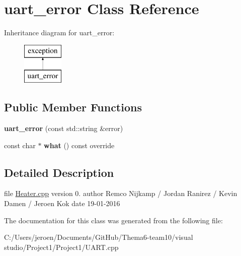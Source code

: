 \hypertarget{classuart__error}{}\section{uart\+\_\+error Class Reference}
\label{classuart__error}
Inheritance diagram for uart\+\_\+error\+:\begin{figure}[H]
\begin{center}
\leavevmode
\includegraphics[height=2.000000cm]{classuart__error}
\end{center}
\end{figure}
\subsection*{Public Member Functions}
\begin{DoxyCompactItemize}
\item 
{\bfseries uart\+\_\+error} (const std\+::string \&error)\hypertarget{classuart__error_a710944fe35f1928d87dd3cad76bdc89f}{}\label{classuart__error_a710944fe35f1928d87dd3cad76bdc89f}

\item 
const char $\ast$ {\bfseries what} () const  override\hypertarget{classuart__error_a8e7bafca0121cbd5669648903f075cf1}{}\label{classuart__error_a8e7bafca0121cbd5669648903f075cf1}

\end{DoxyCompactItemize}


\subsection{Detailed Description}
file \hyperlink{_heater_8cpp}{Heater.\+cpp} version 0. author Remco Nijkamp / Jordan Ranirez / Kevin Damen / Jeroen Kok date 19-\/01-\/2016 

The documentation for this class was generated from the following file\+:\begin{DoxyCompactItemize}
\item 
C\+:/\+Users/jeroen/\+Documents/\+Git\+Hub/\+Thema6-\/team10/visual studio/\+Project1/\+Project1/U\+A\+R\+T.\+cpp\end{DoxyCompactItemize}
